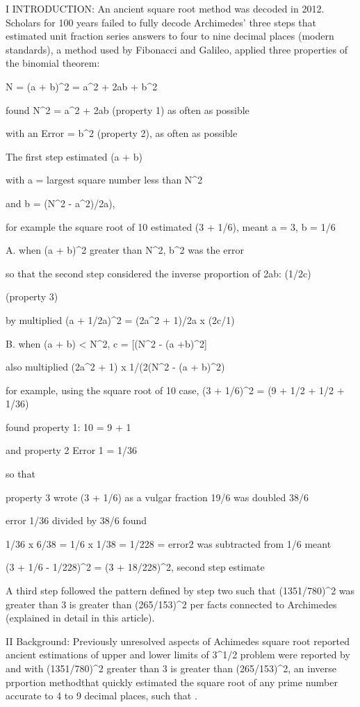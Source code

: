 \documentclass[12pt]{article}
\begin{document}
I INTRODUCTION: An ancient square root method was decoded in 2012. Scholars for 100 years failed to fully decode Archimedes' three steps that estimated unit fraction series answers to four to nine decimal places (modern standards), a method used by Fibonacci and Galileo, applied three properties of the binomial theorem:

N = (a + b)^2 = a^2 + 2ab + b^2  

found N^2 = a^2 + 2ab  (property 1) as often as possible

with an Error = b^2  (property 2), as often as possible

The first step estimated (a + b) 

with a = largest square number less than N^2

and b = (N^2 - a^2)/2a), 

for example the square root of 10 estimated (3 + 1/6), meant a = 3, b = 1/6

A.  when (a + b)^2 greater than  N^2, b^2 was the error

so that the second step considered the inverse proportion of 2ab: (1/2c)

(property 3)

by multiplied (a + 1/2a)^2 = (2a^2 + 1)/2a x (2c/1)

B.  when (a + b) < N^2, c = [(N^2 - (a +b)^2]

also multiplied (2a^2 + 1) x 1/(2(N^2 - (a + b)^2)

for example, using the square root of 10 case, (3 + 1/6)^2 = (9 + 1/2 + 1/2 + 1/36)

found  property 1: 10 = 9 + 1 

and property 2 Error 1 = 1/36

so that 

property 3 wrote (3 + 1/6) as a vulgar fraction 19/6 was doubled 38/6 

error 1/36 divided by 38/6 found

1/36 x 6/38 = 1/6 x 1/38 = 1/228 = error2 was subtracted from 1/6 meant

(3 + 1/6 - 1/228)^2  = (3 + 18/228)^2, second step estimate

A  third step followed the pattern defined by step two such that (1351/780)^2  was  greater than 3  is  greater than (265/153)^2  per facts connected to Archimedes (explained in detail in this article).

II Background: Previously unresolved aspects of  Achimedes square root reported ancient estimations of upper and lower limits of  3^1/2  problem were reported by  and  with (1351/780)^2  greater than 3  is greater than (265/153)^2, an inverse prportion  methodthat quickly estimated the square root of any prime number accurate to 4 to 9 decimal places,
such that  . 
\end{document}
